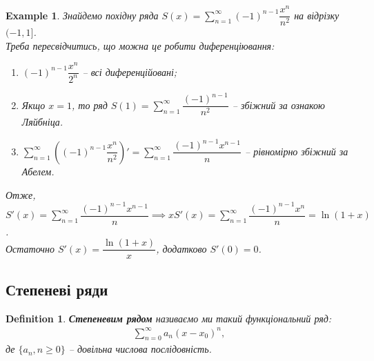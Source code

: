 \documentclass[a4paper, 10pt]{article}
\makeatletter
\def\huge{\displaystyle}
\theoremstyle{theoremdd}
\theoremstyle{theoremdd}
\theoremstyle{theoremdd}
\newtheorem{definition}[theorem]{Definition}
\theoremstyle{theoremdd}
\theoremstyle{theoremdd}
\newtheorem{example}[theorem]{Example}
\theoremstyle{theoremdd}
\theoremstyle{theoremdd}
\theoremstyle{theoremdd}
\theoremstyle{theoremdd}
\renewenvironment{proof}[1][Proof.\\]{\par
\pushQED{\hfill \qed}%
\normalfont \topsep6\p@\@plus6\p@\relax
\trivlist
\item\relax
{\bfseries
#1\@addpunct{.}}\hspace\labelsep\ignorespaces
}{%
\popQED\endtrivlist\@endpefalse
}
\makeatother
\begin{document}

\begin{example}
Знайдемо похідну ряда $S(x) = \huge\sum_{n=1}^\infty (-1)^{n-1}\dfrac{x^n}{n^2}$ на відрізку $(-1,1]$.\\
Треба пересвідчитись, що можна це робити диференціювання:
\begin{enumerate}[nosep,wide=0pt,label={\arabic*)}]
\item $(-1)^{n-1}\dfrac{x^n}{2^n}$ -- всі диференційовані;
\item Якщо $x = 1$, то ряд $S(1) = \huge\sum_{n=1}^\infty \dfrac{(-1)^{n-1}}{n^2}$ -- збіжний за ознакою Ляйбніца.
\item $\huge\sum_{n=1}^\infty \left( (-1)^{n-1}\dfrac{x^n}{n^2} \right)' = \huge\sum_{n=1}^\infty \dfrac{(-1)^{n-1}x^{n-1}}{n}$ -- рівномірно збіжний за Абелем.
\end{enumerate}
Отже, $S'(x) = \huge\sum_{n=1}^\infty \dfrac{(-1)^{n-1} x^{n-1}}{n} \implies x S'(x) = \sum_{n=1}^\infty \dfrac{(-1)^{n-1}x^n}{n} = \ln (1+x)$.\\
Остаточно $S'(x) = \dfrac{\ln(1+x)}{x}$, додатково $S'(0) = 0$.
\end{example}

\subsection{Степеневі ряди}
\begin{definition}
\textbf{Степеневим рядом} називаємо ми такий функціональний ряд:
\begin{align*}
\sum_{n=0}^\infty a_n(x-x_0)^n,
\end{align*}
де $\{a_n, n \geq 0\}$ -- довільна числова послідовність.
\end{definition}
\end{document}
